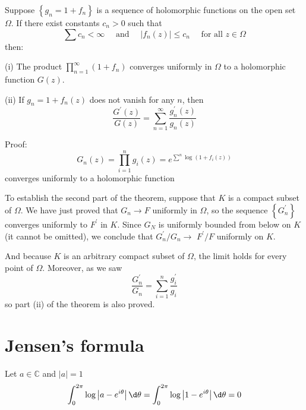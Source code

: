 \documentclass[12pt, oneside]{book}
\begin{document}
\begin{theorem}
    Suppose $\left\{g_n=1+f_n\right\}$ is a sequence of holomorphic functions on the open set $\Omega$. If there exist constants $c_n>0$ such that
    $$
        \sum c_n<\infty \quad \text { and } \quad\left|f_n(z)\right| \leq c_n \quad \text { for all } z \in \Omega
    $$
    then:

    (i) The product $\prod\limits_{n=1}^{\infty} (1+f_n)$ converges uniformly in $\Omega$ to a holomorphic function $G(z)$.

    (ii) If $g_n=1+f_n(z)$ does not vanish for any $n$, then
    $$
        \frac{G^{\prime}(z)}{G(z)}=\sum_{n=1}^{\infty} \frac{g_n^{\prime}(z)}{g_n(z)}
    $$

    Proof:
    $$G_n(z)=\prod_{i=1}^n g_i(z)=e^{\sum\limits^n\log(1+f_i(z))}$$
    converges uniformly to a holomorphic function

    To establish the second part of the theorem, suppose that $K$ is a compact subset of $\Omega$. We have just proved that $G_n \rightarrow F$ uniformly in $\Omega$, so the sequence $\left\{G_n^{\prime}\right\}$ converges uniformly to $F^{\prime}$ in $K$. Since $G_N$ is uniformly bounded from below on $K$ (it cannot be omitted), we conclude that $G_n^{\prime} / G_n \rightarrow$ $F^{\prime} / F$ uniformly on $K$.

    And because $K$ is an arbitrary compact subset of $\Omega$, the limit holds for every point of $\Omega$. Moreover, as we saw
    $$\frac{G_n^{\prime}}{G_n}=\sum_{i=1}^n \frac{g_i^{\prime}}{g_i}$$
    so part (ii) of the theorem is also proved.
\end{theorem}

\section{Jensen's formula}
\begin{lemma}
    Let $a\in \mathbb{C}$ and $\left|a\right| = 1$
    $$\int_0^{2\pi } \log \left|a-e^{i\theta}\right|\d \theta=\int_0^{2\pi } \log \left|1-e^{i\theta}\right|\d \theta=0$$
\end{lemma}
\end{document}
